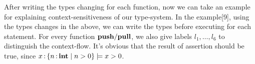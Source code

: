 \documentclass[runningheads]{llncs}
\begin{document}
\begin{parcolumns}{2}
\colplacechunks
\end{parcolumns}

\begin{parcolumns}{2}
\colplacechunks
\end{parcolumns}


After writing the types changing for each function, now we can take an example for explaining context-sensitiveness of our type-system.
In the example[9], using the types changes in the above, we can write the types before executing for each statement.
For every function $\bf{push/pull}$, we also give labels $l_1,\dots,l_6$ to distinguish the context-flow.
It's obvious that the result of assertion should be true, since $x \operatorname{:} \left\{{n \operatorname{:} \mathbf{int} \mid n > 0}\right\}\models x > 0$.
\end{document}
